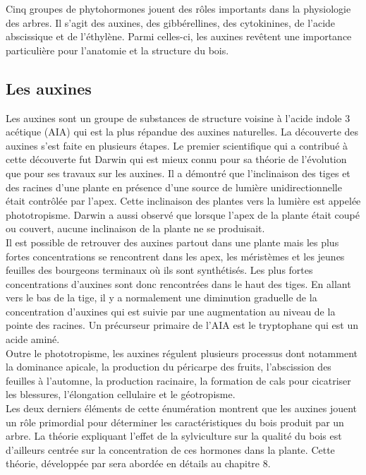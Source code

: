 Cinq groupes de phytohormones jouent des rôles importants dans la physiologie des arbres. Il s'agit des auxines, des gibbérellines, des cytokinines, de l'acide abscissique et de l'éthylène. Parmi celles-ci, les auxines revêtent une importance particulière pour l'anatomie et la structure du bois. 

\subsection{Les auxines}\label{section_auxines} 

Les auxines sont un groupe de substances de structure voisine à l'acide indole 3 acétique (AIA) qui est la plus répandue des auxines naturelles. La découverte des auxines s'est faite en plusieurs étapes. Le premier scientifique qui a contribué à cette découverte fut Darwin qui est mieux connu pour sa théorie de l'évolution que pour ses travaux sur les auxines. Il a démontré que l'inclinaison des tiges et des racines d'une plante en présence d'une source de lumière unidirectionnelle était contrôlée par l'apex. Cette inclinaison des plantes vers la lumière est appelée phototropisme. Darwin a aussi observé que lorsque l'apex de la plante était coupé ou couvert, aucune inclinaison de la plante ne se produisait.\\

Il est possible de retrouver des auxines partout dans une plante mais les plus fortes concentrations se rencontrent dans les apex, les méristèmes et les jeunes feuilles des bourgeons terminaux où ils sont synthétisés. Les plus fortes concentrations d'auxines sont donc rencontrées dans le haut des tiges. En allant vers le bas de la tige, il y a normalement une diminution graduelle de la concentration d'auxines qui est suivie par une augmentation au niveau de la pointe des racines. Un précurseur primaire de l'AIA est le tryptophane qui est un acide aminé. \\

Outre le phototropisme, les auxines régulent plusieurs processus dont notamment la dominance apicale, la production du péricarpe des fruits, l'abscission des feuilles à l'automne, la production racinaire, la formation de cals pour cicatriser les blessures, l'élongation cellulaire et le géotropisme.\\

Les deux derniers éléments de cette énumération montrent que les auxines jouent un rôle primordial pour déterminer les caractéristiques du bois produit par un arbre. La théorie expliquant l'effet de la sylviculture sur la qualité du bois est d'ailleurs centrée sur la concentration de ces hormones dans la plante. Cette théorie, développée par \cite{larson1969wood} sera abordée en détails au chapitre 8.\\

